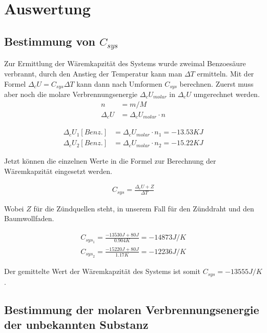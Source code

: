 \section{Auswertung}

\subsection{Bestimmung von $C_{sys}$}
Zur Ermittlung der Wäremkapzität des Systems wurde zweimal Benzoesäure verbrannt, durch den Anstieg der Temperatur kann man $\Delta T$ ermitteln. Mit der Formel $\Delta _c U = C_{sys} \Delta T$
kann dann nach Umformen $C_{sys}$ berechnen. Zuerst muss aber noch die molare Verbrennungsenergie $\Delta_c U_{molar}$ in $\Delta_c U$ umgerechnet werden.
\begin{align}
	n          & = m/M                        \\
	\Delta_c U & = \Delta_c U_{molar} \cdot n
\end{align}


\begin{align*}
	\Delta_c U_1[Benz.] & = \Delta_c U_{molar} \cdot n_1 = -13.53 KJ \\
	\Delta_c U_2[Benz.] & = \Delta_c U_{molar} \cdot n_2 = -15.22 KJ
\end{align*}


Jetzt können die einzelnen Werte in die Formel zur Berechnung der Wäremkapzität eingesetzt werden.

\begin{align}
	C_{sys} = \frac{\Delta_c U + Z}{\Delta T}
\end{align}

Wobei $Z$ für die Zündquellen steht, in unserem Fall für den Zünddraht und den Baumwollfaden.

\begin{align*}
	C_{sys}_1 = \frac{-13530J + 80J} {0.904K} = -14873 J/K \\
	C_{sys}_2 = \frac{-15220J + 80J} {1.17K} = -12236 J/K
\end{align*}

Der gemittelte Wert der Wäremkapzität des Systems ist somit $C_{sys} = -13555 J/K$.

\subsection{Bestimmung der molaren Verbrennungsenergie der unbekannten Substanz}

